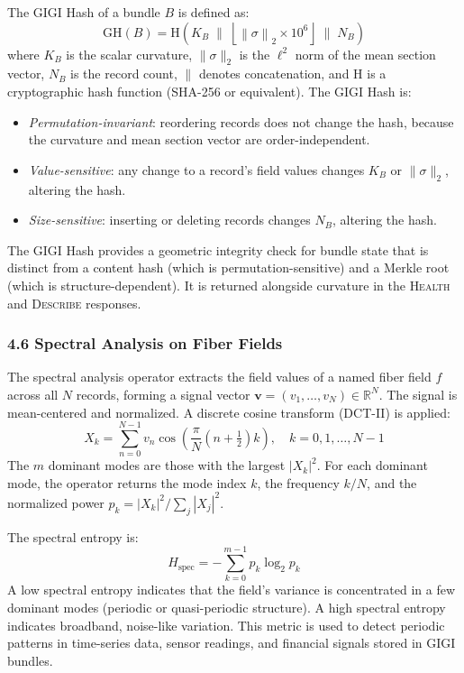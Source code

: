 \documentclass[11pt,letterpaper]{article}
\begin{document}
The GIGI Hash of a bundle $B$ is defined as:
\[
\mathrm{GH}(B) = \mathrm{H}\!\left(K_B \;\|\; \left\lfloor \left\| \sigma \right\|_2 \times 10^6 \right\rfloor \;\|\; N_B \right)
\]
where $K_B$ is the scalar curvature, $\|\sigma\|_2$ is the $\ell^2$ norm of the mean section vector, $N_B$ is the record count, $\|$ denotes concatenation, and $\mathrm{H}$ is a cryptographic hash function (SHA-256 or equivalent). The GIGI Hash is:
\begin{itemize}[nosep]
  \item \emph{Permutation-invariant}: reordering records does not change the hash, because the curvature and mean section vector are order-independent.
  \item \emph{Value-sensitive}: any change to a record's field values changes $K_B$ or $\|\sigma\|_2$, altering the hash.
  \item \emph{Size-sensitive}: inserting or deleting records changes $N_B$, altering the hash.
\end{itemize}
The GIGI Hash provides a geometric integrity check for bundle state that is distinct from a content hash (which is permutation-sensitive) and a Merkle root (which is structure-dependent). It is returned alongside curvature in the \textsc{Health} and \textsc{Describe} responses.


\subsubsection*{4.6 Spectral Analysis on Fiber Fields}

The spectral analysis operator extracts the field values of a named fiber field $f$ across all $N$ records, forming a signal vector $\mathbf{v} = (v_1, \ldots, v_N) \in \mathbb{R}^N$. The signal is mean-centered and normalized. A discrete cosine transform (DCT-II) is applied:
\[
X_k = \sum_{n=0}^{N-1} v_n \cos\!\left(\frac{\pi}{N}\left(n + \tfrac{1}{2}\right)k\right), \quad k = 0, 1, \ldots, N-1
\]
The $m$ dominant modes are those with the largest $|X_k|^2$. For each dominant mode, the operator returns the mode index $k$, the frequency $k/N$, and the normalized power $p_k = |X_k|^2 / \sum_j |X_j|^2$.

The spectral entropy is:
\[
H_{\mathrm{spec}} = -\sum_{k=0}^{m-1} p_k \log_2 p_k
\]
A low spectral entropy indicates that the field's variance is concentrated in a few dominant modes (periodic or quasi-periodic structure). A high spectral entropy indicates broadband, noise-like variation. This metric is used to detect periodic patterns in time-series data, sensor readings, and financial signals stored in GIGI bundles.
\end{document}
